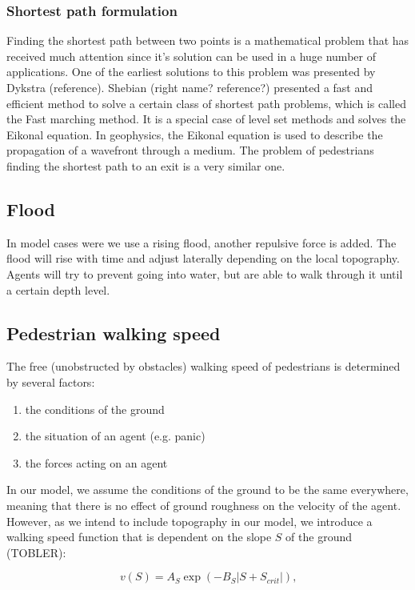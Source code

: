 \documentclass[11pt]{article}
\begin{document}
\subsubsection{Shortest path formulation}
Finding the shortest path between two points is a mathematical problem that has received much attention since it's solution can be used in a huge number of applications. One of the earliest solutions to this problem was presented by Dykstra (reference). Shebian (right name? reference?) presented a fast and efficient method to solve a certain class of shortest path problems, which is called the Fast marching method. It is a special case of level set methods and solves the Eikonal equation. 
In geophysics, the Eikonal equation is used to describe the propagation of a wavefront through a medium. The problem of pedestrians finding the shortest path to an exit is a very similar one. 

\subsection{Flood}

In model cases were we use a rising flood, another repulsive force is added. The flood will rise with time and adjust laterally depending on the local topography. Agents will try to prevent going into water, but are able to walk through it until a certain depth level.

\subsection{Pedestrian walking speed}

The free (unobstructed by obstacles) walking speed of pedestrians is determined by several factors:

\begin{enumerate}
\item the conditions of the ground
\item the situation of an agent (e.g. panic)
\item the forces acting on an agent
\end{enumerate}

In our model, we assume the conditions of the ground to be the same everywhere, meaning that there is no effect of ground roughness on the velocity of the agent. However, as we intend to include topography in our model, we introduce a walking speed function that is dependent on the slope $S$ of the ground (TOBLER):

\begin{equation}
	v(S) = A_{S} \exp{\left( -B_S | S + S_{crit} |  \right)}\mbox{,}
\end{equation}
\end{document}
